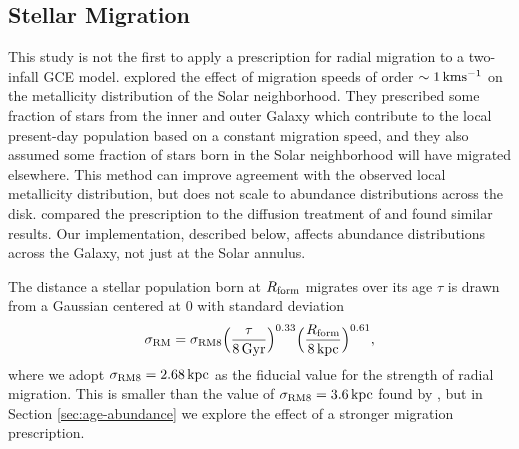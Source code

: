 \documentclass[twocolumn,twocolappendix,linenumbers]{aastex631}
\begin{document}
\subsection{Stellar Migration}
\label{sec:migration}

This study is not the first to apply a prescription for radial migration to a two-infall GCE model. \citet{spitoni_effect_2015} explored the effect of migration speeds of order $\sim1\,{\rm km}{\rm s}^{-1}$ on the metallicity distribution of the Solar neighborhood. They prescribed some fraction of stars from the inner and outer Galaxy which contribute to the local present-day population based on a constant migration speed, and they also assumed some fraction of stars born in the Solar neighborhood will have migrated elsewhere. This method can improve agreement with the observed local metallicity distribution, but does not scale to abundance distributions across the disk. \citet{palla_mgfe_2022} compared the \citet{spitoni_effect_2015} prescription to the diffusion treatment of \citet{frankel_measuring_2018} and found similar results. Our implementation, described below, affects abundance distributions across the Galaxy, not just at the Solar annulus.


The distance a stellar population born at $R_{\rm form}$ migrates over its age $\tau$ is drawn from a Gaussian centered at 0 with standard deviation
\begin{equation}
    \sigma_{\rm RM} = \sigma_{\rm RM8} \Big(\frac{\tau}{8\,{\rm Gyr}}\Big)^{0.33} \Big(\frac{R_{\rm form}}{8\,{\rm kpc}}\Big)^{0.61},
    \label{eq:radial-migration}
\end{equation}
where we adopt $\sigma_{\rm RM8}=2.68\,{\rm kpc}$ as the fiducial value for the strength of radial migration. This is smaller than the value of $\sigma_{\rm RM8}=3.6\,{\rm kpc}$ found by \citet{frankel_measuring_2018}, but in Section \ref{sec:age-abundance} we explore the effect of a stronger migration prescription.
\end{document}
